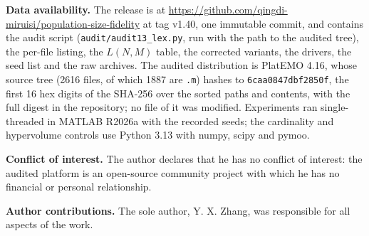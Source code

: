 \documentclass{SCIS2026}
\begin{document}
{\sloppy \noindent\textbf{Data availability.} The release is at \url{https://github.com/qingdi-miruisi/population-size-fidelity} at tag v1.40, one immutable commit, and contains the audit script (\texttt{audit/audit13\_lex.py}, run with the path to the audited tree), the per-file listing, the $L(N,M)$ table, the corrected variants, the drivers, the seed list and the raw archives. The audited distribution is PlatEMO 4.16, whose source tree (2616 files, of which 1887 are \texttt{.m}) hashes to \texttt{6caa0847dbf2850f}, the first 16 hex digits of the SHA-256 over the sorted paths and contents, with the full digest in the repository; no file of it was modified. Experiments ran single-threaded in MATLAB R2026a with the recorded seeds; the cardinality and hypervolume controls use Python 3.13 with numpy, scipy and pymoo.\par}

\noindent\textbf{Conflict of interest.} The author declares that he has no conflict of interest: the audited platform is an open-source community project with which he has no financial or personal relationship.

\noindent\textbf{Author contributions.} The sole author, Y. X. Zhang, was responsible for all aspects of the work.


\end{document}
